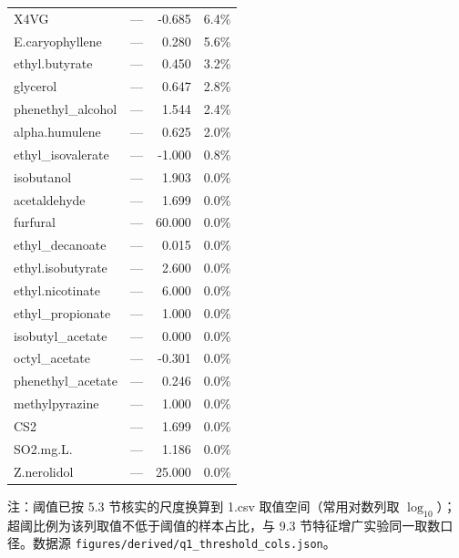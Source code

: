 \begin{longtable}{@{}p{}p{}r r@{}}
X4VG & --- & -0.685 & 6.4\% \\
E.\allowbreak{}caryophyllene & --- & 0.280 & 5.6\% \\
ethyl.\allowbreak{}butyrate & --- & 0.450 & 3.2\% \\
glycerol & --- & 0.647 & 2.8\% \\
phenethyl\_alcohol & --- & 1.544 & 2.4\% \\
alpha.\allowbreak{}humulene & --- & 0.625 & 2.0\% \\
ethyl\_isovalerate & --- & -1.000 & 0.8\% \\
isobutanol & --- & 1.903 & 0.0\% \\
acetaldehyde & --- & 1.699 & 0.0\% \\
furfural & --- & 60.000 & 0.0\% \\
ethyl\_decanoate & --- & 0.015 & 0.0\% \\
ethyl.\allowbreak{}isobutyrate & --- & 2.600 & 0.0\% \\
ethyl.\allowbreak{}nicotinate & --- & 6.000 & 0.0\% \\
ethyl\_propionate & --- & 1.000 & 0.0\% \\
isobutyl\_acetate & --- & 0.000 & 0.0\% \\
octyl\_acetate & --- & -0.301 & 0.0\% \\
phenethyl\_acetate & --- & 0.246 & 0.0\% \\
methylpyrazine & --- & 1.000 & 0.0\% \\
CS2 & --- & 1.699 & 0.0\% \\
SO2.\allowbreak{}mg.\allowbreak{}L.\allowbreak{} & --- & 1.186 & 0.0\% \\
Z.\allowbreak{}nerolidol & --- & 25.000 & 0.0\% \\
\end{longtable}

\noindent\footnotesize 注：阈值已按 5.3 节核实的尺度换算到 1.csv 取值空间（常用对数列取 $\log_{10}$）；超阈比例为该列取值不低于阈值的样本占比，与 9.3 节特征增广实验同一取数口径。数据源 \texttt{figures/derived/q1\_threshold\_cols.json}。



